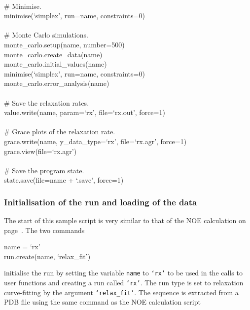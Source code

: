 \begin{exampleenv}
 \\
\# Minimise. \\
minimise(`simplex', run=name, constraints=0) \\
 \\
\# Monte Carlo simulations. \\
monte\_carlo.setup(name, number=500) \\
monte\_carlo.create\_data(name) \\
monte\_carlo.initial\_values(name) \\
minimise(`simplex', run=name, constraints=0) \\
monte\_carlo.error\_analysis(name) \\
 \\
\# Save the relaxation rates. \\
value.write(name, param=`rx', file=`rx.out', force=1) \\
 \\
\# Grace plots of the relaxation rate. \\
grace.write(name, y\_data\_type=`rx', file=`rx.agr', force=1) \\
grace.view(file=`rx.agr') \\
 \\
\# Save the program state. \\
state.save(file=name + `.save', force=1)
\end{exampleenv}


\subsubsection{Initialisation of the run and loading of the data}

The start of this sample script is very similar to that of the NOE calculation on page~\pageref{NOE initialisation}.  The two commands

\begin{exampleenv}
name = `rx' \\
run.create(name, `relax\_fit')
\end{exampleenv}

initialise the run by setting the variable \texttt{name} to \texttt{`rx'} to be used in the calls to user functions and creating a run called \texttt{`rx'}.  The run type is set to relaxation curve-fitting by the argument \texttt{`relax\_fit'}.  The sequence is extracted from a PDB file using the same command as the NOE calculation script

